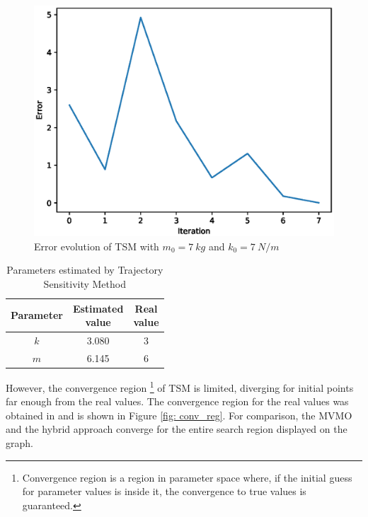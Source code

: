 \begin{figure}[h]
	\caption{Error evolution of TSM with $m_{0} = 7\ kg$ and $k_{0} = 7\ N/m$}
	\begin{center}
		\includegraphics[scale=0.6]{Images/spring_mass_ts_conv.eps}
	\end{center}
	\label{fig: TS_conv}
\end{figure}

\begin{table}[h]
	\caption{Parameters estimated by Trajectory Sensitivity Method}
	\begin{center}
		\begin{tabular}{c|c|c}
			Parameter & \shortstack{Estimated \\ value} & \shortstack{Real \\ value} \\
			\hline
			$k$ & 3.080 & 3 \\
			$m$ & 6.145 & 6 \\
		\end{tabular}
	\end{center}
	\label{tab: spring_mass_ts}
\end{table}

However, the convergence region \footnote{Convergence region is a region in parameter space where, if the initial guess for parameter values is inside it, the convergence to true values is guaranteed.} of TSM is limited, diverging for initial points far enough from the real values. The convergence region for the real values was obtained in \cite{Ecyo} and is shown in Figure \ref{fig: conv_reg}. For comparison, the MVMO and the hybrid approach converge for the entire search region displayed on the graph.

